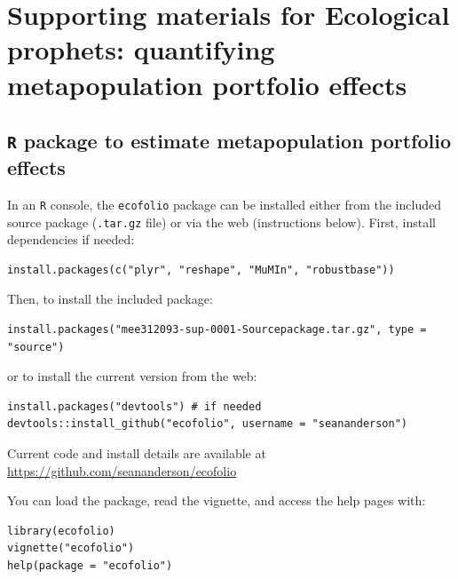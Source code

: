 \section{Supporting materials for Ecological prophets: quantifying metapopulation portfolio effects}

\subsection{\texttt{R} package to estimate metapopulation portfolio effects}

In an \texttt{R} console, the \texttt{ecofolio} package can be installed either
from the included source package (\texttt{.tar.gz} file)
or via the web (instructions below). First, install dependencies if needed:

\begin{verbatim}
install.packages(c("plyr", "reshape", "MuMIn", "robustbase"))
\end{verbatim}

\noindent
Then, to install the included package:


\begin{verbatim}
install.packages("mee312093-sup-0001-Sourcepackage.tar.gz", type = "source")
\end{verbatim}


\noindent
or to install the current version from the web:

\begin{verbatim}
install.packages("devtools") # if needed
devtools::install_github("ecofolio", username = "seananderson")
\end{verbatim}

\noindent
Current code and install details are available at\\ \url{https://github.com/seananderson/ecofolio}
\clearpage


\noindent
You can load the package, read the vignette, and access the help pages with:

\begin{verbatim}
library(ecofolio)
vignette("ecofolio")
help(package = "ecofolio")
\end{verbatim}

